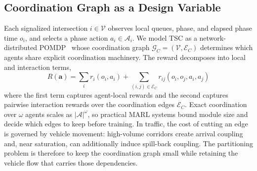 \documentclass[journal]{IEEEtran}
\theoremstyle{definition}
\begin{document}
\subsection{Coordination Graph as a Design Variable}
\label{sec:ndpomdp}

Each signalized intersection $i \in \mathcal{V}$ observes local queues, phase, and elapsed phase time $o_i$, and selects a phase action $a_i \in \mathcal{A}_i$. We model TSC as a network-distributed POMDP~\citep{nair2005ndpomdp,kok2006ndpomdp,oliehoek2012ndpomdp} whose coordination graph $\mathcal{G}_C=(\mathcal{V},\mathcal{E}_C)$ determines which agents share explicit coordination machinery.
The reward decomposes into local and interaction terms,
\begin{equation}
    R(\mathbf{a})
    =
    \sum_i r_i(o_i,a_i)
    +
    \sum_{(i,j)\in\mathcal{E}_C}
    r_{ij}(o_i,o_j,a_i,a_j)
    \label{eq:ndpomdp}
\end{equation}
\noindent where the first term captures agent-local rewards and the second captures pairwise interaction rewards over the coordination edges $\mathcal{E}_C$.
Exact coordination over $\omega$ agents scales as $|\mathcal{A}|^\omega$, so practical MARL systems bound module size and decide which edges to keep before training. In traffic, the cost of cutting an edge is governed by vehicle movement: high-volume corridors create arrival coupling and, near saturation, can additionally induce spill-back coupling. The partitioning problem is therefore to keep the coordination graph small while retaining the vehicle flow that carries those dependencies.
\end{document}

